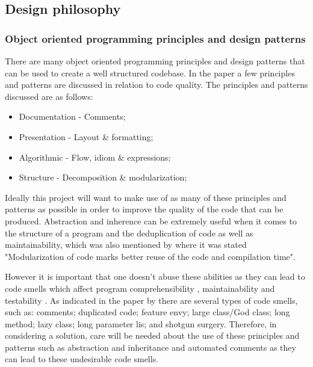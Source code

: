 \subsection{Design philosophy}

\subsubsection{Object oriented programming principles and design patterns}

There are many object oriented programming principles and design patterns that can be used to create a well structured codebase. In the paper \cite{10.1145/3428029.3428047} a few principles and patterns are discussed in relation to code quality. The principles and patterns discussed are as follows:
\begin{itemize}
	\item Documentation - Comments;
	\item Presentation - Layout \& formatting;
	\item Algorithmic - Flow, idiom \& expressions;
	\item Structure - Decomposition \& modularization;
\end{itemize}

Ideally this project will want to make use of as many of these principles and patterns as possible in order to improve the quality of the code that can be produced. Abstraction and inherence can be extremely useful when it comes to the structure of a program and the deduplication of code as well as maintainability, which was also mentioned by \cite{8681007} where it was stated "Modularization of code marks better reuse of the code and compilation time".

However it is important that one doesn't abuse these abilities as they can lead to code smells which affect program comprehensibility \citep{8681007, ImpactOfAntipatterns}, maintainability \citep{8681007, ImpactOfAntipatterns2, CodeSmellsAndMaintainability} and testability \citep{8681007, TestCasesAndCodeQuality}. As indicated in the paper by \cite{10.1145/3555228.3555268} there are several types of code smells, such as: comments; duplicated code; feature envy; large class/God class; long method; lazy class; long parameter lis; and shotgun surgery. Therefore, in considering a solution, care will be needed about the use of these principles and patterns such as abstraction and inheritance and automated comments as they can lead to these undesirable code smells.
